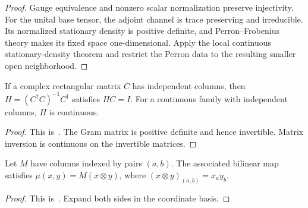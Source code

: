 \begin{proof}\leanok
    Gauge equivalence and nonzero scalar normalization preserve
    injectivity. For the unital base tensor, the adjoint channel is
    trace preserving and irreducible. Its normalized stationary density
    is positive definite, and Perron--Frobenius theory makes its fixed
    space one-dimensional. Apply the local continuous stationary-density
    theorem and restrict the Perron data to the resulting smaller open
    neighborhood.
\end{proof}

\begin{lemma}
    \label{thm:spt_gram_left_inverse}
    \leanok
    If a complex rectangular matrix $C$ has independent columns, then
    $H=(C^\dagger C)^{-1}C^\dagger$ satisfies $HC=I$.
    For a continuous family with independent columns, $H$ is continuous.
\end{lemma}
\begin{proof}\leanok
    This is~\cite[``Gram left inverses'']{QICLean2026Blueprint}.
    The Gram matrix is positive definite and hence invertible.
    Matrix inversion is continuous on the invertible matrices.
\end{proof}

\begin{lemma}
    \label{thm:spt_bilinear_coordinates}
    \leanok
    Let $M$ have columns indexed by pairs $(a,b)$. The associated bilinear
    map satisfies $\mu(x,y)=M(x\otimes y)$, where
    $(x\otimes y)_{(a,b)}=x_a y_b$.
\end{lemma}
\begin{proof}\leanok
    This is~\cite[``Coordinates of a bilinear map'']{QICLean2026Blueprint}.
    Expand both sides in the coordinate basis.
\end{proof}

